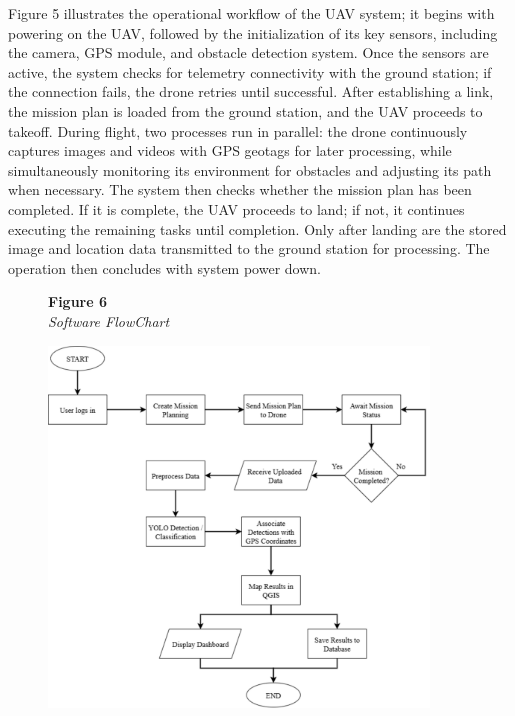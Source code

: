 Figure 5 illustrates the operational workflow of the UAV system; it begins with powering on the UAV, followed by the initialization of its key sensors, including the camera, GPS module, and obstacle detection system. Once the sensors are active, the system checks for telemetry connectivity with the ground station; if the connection fails, the drone retries until successful. After establishing a link, the mission plan is loaded from the ground station, and the UAV proceeds to takeoff. During flight, two processes run in parallel: the drone continuously captures images and videos with GPS geotags for later processing, while simultaneously monitoring its environment for obstacles and adjusting its path when necessary. The system then checks whether the mission plan has been completed. If it is complete, the UAV proceeds to land; if not, it continues executing the remaining tasks until completion. Only after landing are the stored image and location data transmitted to the ground station for processing. The operation then concludes with system power down.

\begin{figure}[H]
	\raggedright
	\textbf{Figure 6} \\ %
	\textit{Software FlowChart} %

	\vspace{0.5em}
	\centering
	\includegraphics[width=0.9\textwidth]{figures/SoftFlow.pdf} %

	\vspace{0.5em}
	\raggedright

	\label{fig:SoftFlow}
\end{figure}

